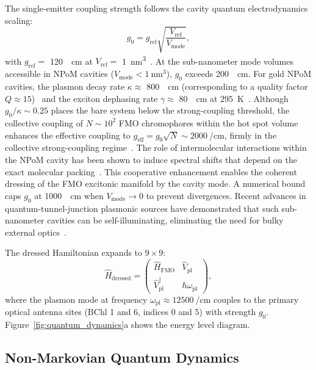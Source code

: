 \documentclass[12pt]{article}
\begin{document}
The single-emitter coupling strength follows the cavity quantum electrodynamics scaling:
\begin{equation}
g_0 = g_{\mathrm{ref}} \sqrt{\frac{V_{\mathrm{ref}}}{V_{\mathrm{mode}}}},
\label{eq:coupling_scaling}
\end{equation}
with $g_{\mathrm{ref}} =$ \SI{120}{\per\cm} at $V_{\mathrm{ref}} =$ \SI{1}{\nm\cubed}~\cite{Chikkaraddy2016}.
At the sub-nanometer mode volumes accessible in NPoM cavities ($V_{\mathrm{mode}} < \SI{1}{\nm\cubed}$), $g_0$ exceeds \SI{200}{\per\cm}. For gold NPoM cavities, the plasmon decay rate $\kappa \approx$ \SI{800}{\per\cm} (corresponding to a quality factor $Q \approx 15$)~\cite{Chikkaraddy2016} and the exciton dephasing rate $\gamma \approx$ \SI{80}{\per\cm} at \SI{295}{\kelvin}~\cite{Ishizaki2009}. Although $g_0/\kappa \sim 0.25$ places the bare system below the strong-coupling threshold, the collective coupling of $N \sim 10^2$ FMO chromophores within the hot spot volume enhances the effective coupling to $g_{\mathrm{eff}} = g_0\sqrt{N} \sim \SI{2000}{\per\cm}$, firmly in the collective strong-coupling regime~\cite{Chikkaraddy2016,Ringstrom2026}.
The role of intermolecular interactions within the NPoM cavity has been shown to induce spectral shifts that depend on the exact molecular packing~\cite{Wei2025}. This cooperative enhancement enables the coherent dressing of the FMO excitonic manifold by the cavity mode.
A numerical bound caps $g_0$ at \SI{1000}{\per\cm} when $V_{\mathrm{mode}} \to 0$ to prevent divergences.
Recent advances in quantum-tunnel-junction plasmonic sources have demonstrated that such sub-nanometer cavities can be self-illuminating, eliminating the need for bulky external optics~\cite{Lee2025}.

The dressed Hamiltonian expands to $9 \times 9$:
\begin{equation}
\hat{H}_{\mathrm{dressed}} = 
\begin{pmatrix}
\hat{H}_{\mathrm{FMO}} & \hat{V}_{\mathrm{pl}} \\
\hat{V}_{\mathrm{pl}}^{\dagger} & \hbar\omega_{\mathrm{pl}}
\end{pmatrix},
\label{eq:dressed_hamiltonian}
\end{equation}
where the plasmon mode at frequency $\omega_{\mathrm{pl}} \approx \SI{12500}{\per\cm}$ couples to the primary optical antenna sites (BChl 1 and 6, indices 0 and 5) with strength $g_0$.
Figure~\ref{fig:quantum_dynamics}a shows the energy level diagram.

\subsection*{Non-Markovian Quantum Dynamics}
\end{document}
